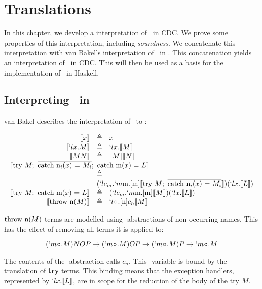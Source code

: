 \chapter{Translations}\label{chapter:translations}


In this chapter, we develop a interpretation of \lmu\ in CDC.
We prove some properties of this interpretation, including \emph{soundness}.
We concatenate this interpretation with van Bakel's interpretation of \ltry\ in \lmu.
This concatenation yields an interpretation of \ltry\ in CDC.
This will then be used as a basis for the implementation of \ltry\ in Haskell.

\section{Interpreting \ltry\ in \lmu}

van Bakel describes the interpretation of \ltry\ to \lmu:

{
\[
  \begin{array}{rcl}
    \tr{x} &\triangleq& x \\
    \tr{`lx.M} &\triangleq& `lx.\tr{M} \\
    \tr{M N} &\triangleq& \tr{M}\tr{N} \\
    \multicolumn{3}{l}{\tr{\try M;\ \mcatch;\ \catch{m($x$) = $L$}}} \\
    & \triangleq & \\
    &\multicolumn{2}{l}{ (`lc_m.`m\text{m}.[\text{m}]\tr{\try M;\ \mcatch})(`lx.\tr{L})} \\
    
    \tr{\try M;\ \catch{m($x$) = $L$}} & \triangleq & (`lc_m.`m\text{m}.[\text{m}]\tr{M})(`lx.\tr{L}) \\
    \tr{\throw{n($M$)}} &\triangleq& `l\nonocc.[\text{n}]c_n\tr{M}
  \end{array}
\]
}

$\text{throw n($M$)}$ terms are modelled using \lmu-abstractions of non-occurring names. This has the effect of removing all terms it is applied to:

\[
  (`m\nonocc.M)NOP \to (`m\nonocc.M)OP \to (`m\nonocc.M)P \to `m\nonocc.M
\]

The contents of the \lmu-abstraction calls $c_n$.
This \lam-variable is bound by the translation of \textbf{try} terms.
This binding means that the exception handlers, represented by $`lx.\llbracket L \rrbracket$,
are in scope for the reduction of the body of the try $M$.

